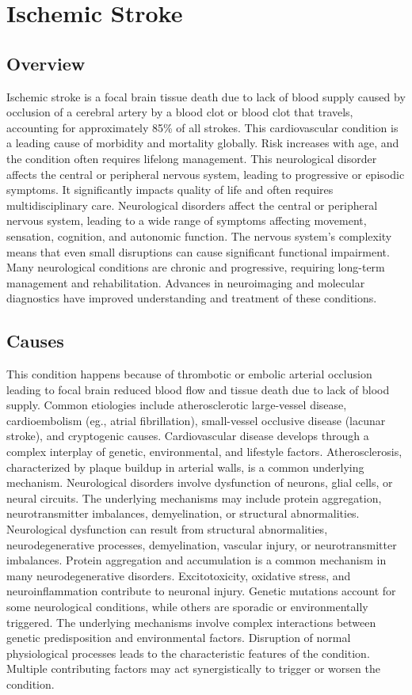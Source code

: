 \chapter{Ischemic Stroke}
\label{sec:Ischemic Stroke}

\section{Overview}
Ischemic stroke is a focal brain tissue death due to lack of blood supply caused by occlusion of a cerebral artery by a blood clot or blood clot that travels, accounting for approximately 85\% of all strokes. This cardiovascular condition is a leading cause of morbidity and mortality globally. Risk increases with age, and the condition often requires lifelong management. This neurological disorder affects the central or peripheral nervous system, leading to progressive or episodic symptoms. It significantly impacts quality of life and often requires multidisciplinary care. Neurological disorders affect the central or peripheral nervous system, leading to a wide range of symptoms affecting movement, sensation, cognition, and autonomic function. The nervous system's complexity means that even small disruptions can cause significant functional impairment. Many neurological conditions are chronic and progressive, requiring long-term management and rehabilitation. Advances in neuroimaging and molecular diagnostics have improved understanding and treatment of these conditions.
\section{Causes}
This condition happens because of thrombotic or embolic arterial occlusion leading to focal brain reduced blood flow and tissue death due to lack of blood supply. Common etiologies include atherosclerotic large-vessel disease, cardioembolism (eg., atrial fibrillation), small-vessel occlusive disease (lacunar stroke), and cryptogenic causes. Cardiovascular disease develops through a complex interplay of genetic, environmental, and lifestyle factors. Atherosclerosis, characterized by plaque buildup in arterial walls, is a common underlying mechanism. Neurological disorders involve dysfunction of neurons, glial cells, or neural circuits. The underlying mechanisms may include protein aggregation, neurotransmitter imbalances, demyelination, or structural abnormalities. Neurological dysfunction can result from structural abnormalities, neurodegenerative processes, demyelination, vascular injury, or neurotransmitter imbalances. Protein aggregation and accumulation is a common mechanism in many neurodegenerative disorders. Excitotoxicity, oxidative stress, and neuroinflammation contribute to neuronal injury. Genetic mutations account for some neurological conditions, while others are sporadic or environmentally triggered. The underlying mechanisms involve complex interactions between genetic predisposition and environmental factors. Disruption of normal physiological processes leads to the characteristic features of the condition. Multiple contributing factors may act synergistically to trigger or worsen the condition.
